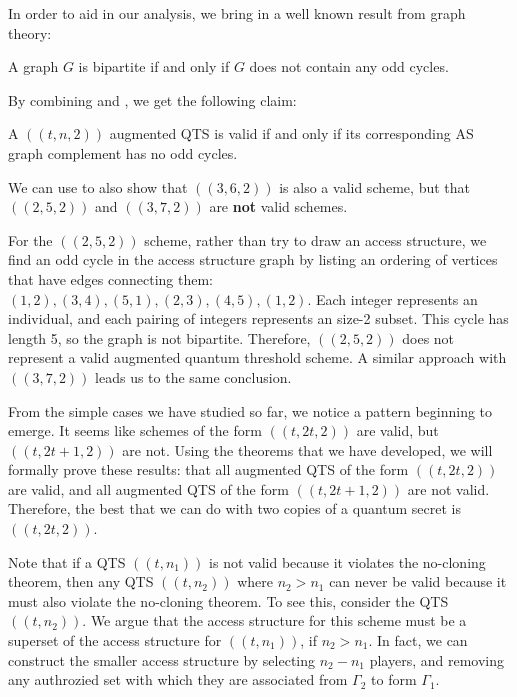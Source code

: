 In order to aid in our analysis, we bring in a well known result from graph theory:

\begin{theorem}
	\label{thm:bipartite}
	A graph $G$ is bipartite if and only if $G$ does not contain any odd cycles.
\end{theorem}

By combining  and , we get the following claim:

\begin{corollary}
    \label{cor:oddcycle-valid}
    A $((t,n,2))$ augmented QTS is valid if and only if its corresponding AS graph complement has no odd cycles.
\end{corollary}

We can use  to also show that $((3,6,2))$ is also a valid scheme, but that $((2,5,2))$ and $((3,7,2))$ are \textbf{not} valid schemes.

For the $((2,5,2))$ scheme, rather than try to draw an access structure, we find an odd cycle in the access structure graph by listing an ordering of vertices that have edges connecting them: $(1,2), (3,4), (5,1), (2,3), (4,5), (1,2)$. Each integer represents an individual, and each pairing of integers represents an size-2 subset. This cycle has length 5, so the graph is not bipartite. Therefore, $((2,5,2))$ does not represent a valid augmented quantum threshold scheme. A similar approach with $((3,7,2))$ leads us to the same conclusion.

From the simple cases we have studied so far, we notice a pattern beginning to emerge. It seems like schemes of the form $((t,2t,2))$ are valid, but $((t,2t+1,2))$ are not. Using the theorems that we have developed, we will formally prove these results: that all augmented QTS of the form $((t,2t,2))$ are valid, and all augmented QTS of the form $((t, 2t+1, 2))$ are not valid. Therefore, the best that we can do with two copies of a quantum secret is $((t,2t,2))$. 

\begin{remark}
    Note that if a QTS $((t,n_1))$ is not valid because it violates the no-cloning theorem, then any QTS $((t,n_2))$ where $n_2 > n_1$ can never be valid because it must also violate the no-cloning theorem. To see this, consider the QTS $((t,n_2))$. We argue that the access structure for this scheme must be a superset of the access structure for $((t,n_1))$, if $n_2 > n_1$. In fact, we can construct the smaller access structure by selecting $n_2-n_1$ players, and removing any authrozied set with which they are associated from $\Gamma_2$ to form $\Gamma_1$.
\end{remark}

